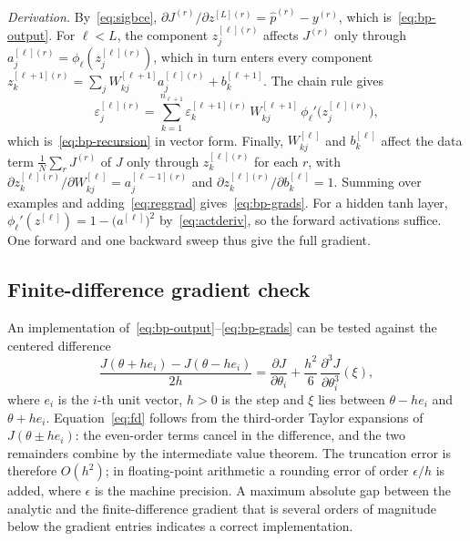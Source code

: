 \textit{Derivation.} By~\eqref{eq:sigbce}, $\partial J^{(r)}/\partial z^{[L](r)}=\hat p^{(r)}-y^{(r)}$, which is~\eqref{eq:bp-output}. For $\ell<L$, the component $z^{[\ell](r)}_j$ affects $J^{(r)}$ only through $a^{[\ell](r)}_j=\phi_\ell(z^{[\ell](r)}_j)$, which in turn enters every component $z^{[\ell+1](r)}_k=\sum_{j}W^{[\ell+1]}_{kj}a^{[\ell](r)}_j+b^{[\ell+1]}_k$. The chain rule gives
\begin{equation*}
  \varepsilon^{[\ell](r)}_j=\sum_{k=1}^{n_{\ell+1}}\varepsilon^{[\ell+1](r)}_k\,W^{[\ell+1]}_{kj}\,\phi_\ell'\bigl(z^{[\ell](r)}_j\bigr),
\end{equation*}
which is~\eqref{eq:bp-recursion} in vector form. Finally, $W^{[\ell]}_{kj}$ and $b^{[\ell]}_k$ affect the data term $\tfrac1N\sum_r J^{(r)}$ of $J$ only through $z^{[\ell](r)}_k$ for each $r$, with $\partial z^{[\ell](r)}_k/\partial W^{[\ell]}_{kj}=a^{[\ell-1](r)}_j$ and $\partial z^{[\ell](r)}_k/\partial b^{[\ell]}_k=1$. Summing over examples and adding~\eqref{eq:reggrad} gives~\eqref{eq:bp-grads}. For a hidden tanh layer, $\phi_\ell'(z^{[\ell]})=1-\bigl(a^{[\ell]}\bigr)^{2}$ by~\eqref{eq:actderiv}, so the forward activations suffice. One forward and one backward sweep thus give the full gradient.

\subsection{Finite-difference gradient check}
\label{sec:prelim-fd}

An implementation of~\eqref{eq:bp-output}--\eqref{eq:bp-grads} can be tested against the centered difference
\begin{equation}
  \frac{J(\theta+h e_i)-J(\theta-h e_i)}{2h}=\frac{\partial J}{\partial\theta_i}+\frac{h^{2}}{6}\,\frac{\partial^{3}J}{\partial\theta_i^{3}}(\xi),
  \label{eq:fd}
\end{equation}
where $e_i$ is the $i$-th unit vector, $h>0$ is the step and $\xi$ lies between $\theta-he_i$ and $\theta+he_i$. Equation~\eqref{eq:fd} follows from the third-order Taylor expansions of $J(\theta\pm he_i)$: the even-order terms cancel in the difference, and the two remainders combine by the intermediate value theorem. The truncation error is therefore $O(h^{2})$; in floating-point arithmetic a rounding error of order $\epsilon/h$ is added, where $\epsilon$ is the machine precision. A maximum absolute gap between the analytic and the finite-difference gradient that is several orders of magnitude below the gradient entries indicates a correct implementation.

